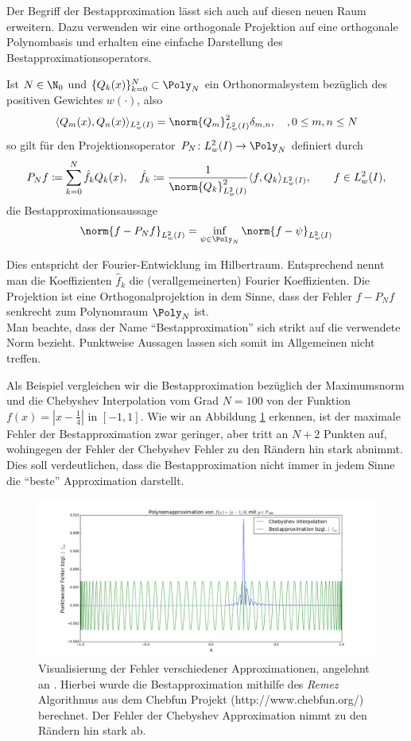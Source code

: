 Der Begriff der Bestapproximation lässt sich auch auf diesen neuen Raum erweitern. Dazu verwenden wir eine orthogonale Projektion auf eine orthogonale Polynombasis und erhalten eine einfache Darstellung des Bestapproximationsoperators.
\begin{maththeorem}
Ist $N\in\N_0$ und $\lbrace Q_k(x)\rbrace_{k=0}^N\subset \Poly_N$ ein Orthonormalsystem bezüglich des positiven Gewichtes $w(\cdot)$, also 
\[\langle Q_m(x),Q_n(x)\rangle_{L_w^2(I)}=\norm{Q_m}^2_{L_w^2(I)}\delta_{m,n},\quad, 0\le m,n\le N\]
so gilt für den Projektionsoperator $P_N\colon L_w^2(I)\to \Poly_N$ definiert durch 
\[P_Nf\coloneqq \sum_{k=0}^N\hat{f}_kQ_k(x),\quad \hat{f}_k\coloneqq \frac{1}{\norm{Q_k}_{L_w^2(I)}^2}\langle f,Q_k\rangle_{L_w^2(I)},\qquad f\in L^2_w(I),\]
die Bestapproximationsaussage
\[\norm{f-P_Nf}_{L_w^2(I)}=\inf\limits_{\psi\in\Poly_N}\norm{f-\psi}_{L_w^2(I)}\]
\end{maththeorem}
Dies entspricht der Fourier-Entwicklung im Hilbertraum. Entsprechend nennt man die Koeffizienten $\hat{f}_k$ die (verallgemeinerten) Fourier Koeffizienten. Die Projektion ist eine Orthogonalprojektion in dem Sinne, dass der Fehler $f-P_Nf$ senkrecht zum Polynomraum $\Poly_N$ ist.\\
Man beachte, dass der Name "`Bestapproximation"' sich strikt auf die verwendete Norm bezieht. Punktweise Aussagen lassen sich somit im Allgemeinen nicht treffen. 
\begin{mathbsp}
Als Beispiel vergleichen wir die Bestapproximation bezüglich der Maximumsnorm und die Chebyshev Interpolation vom Grad $N=100$ von der Funktion $f(x)=|x-\frac{1}{4}|$ in $[-1,1]$. Wie wir an Abbildung \ref{polyapproxcomp} erkennen, ist der maximale Fehler der Bestapproximation zwar geringer, aber tritt an $N+2$ Punkten auf, wohingegen der Fehler der Chebyshev Fehler zu den Rändern hin stark abnimmt. Dies soll verdeutlichen, dass die Bestapproximation nicht immer in jedem Sinne die "`beste"' Approximation darstellt.
\begin{figure}[ht]
 \center
 \includegraphics[width=\linewidth]{Figures/polynomial_approx_comparison.png}
 \caption{Visualisierung der Fehler verschiedener Approximationen, angelehnt an \autocite{Trefethen}. Hierbei wurde die Bestapproximation mithilfe des \emph{Remez} Algorithmus aus dem Chebfun Projekt (http://www.chebfun.org/) berechnet. Der Fehler der Chebyshev Approximation nimmt zu den Rändern hin stark ab.}
 \label{polyapproxcomp}
\end{figure}
\end{mathbsp}
